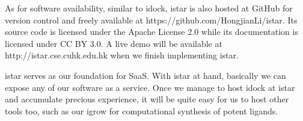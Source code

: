 As for software availability, similar to idock, istar is also hosted at GitHub for version control and freely available at https://github.com/HongjianLi/istar. Its source code is licensed under the Apache License 2.0 while its documentation is licensed under CC BY 3.0. A live demo will be available at http://istar.cse.cuhk.edu.hk when we finish implementing istar.

istar serves as our foundation for SaaS. With istar at hand, basically we can expose any of our software as a service. Once we manage to host idock at istar and accumulate precious experience, it will be quite easy for us to host other tools too, such as our igrow for computational synthesis of potent ligands.

\chapterend
